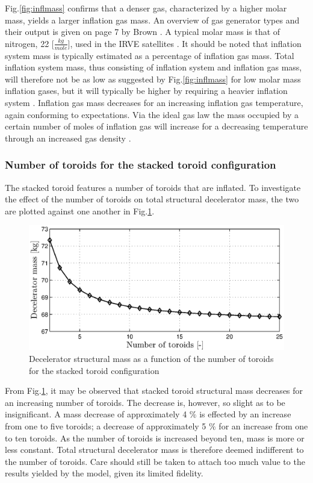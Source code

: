 Fig.\ref{fig:inflmass} confirms that a denser gas, characterized by a higher molar mass, yields a larger inflation gas mass. An overview of gas generator types and their output is given on page 7 by Brown \cite{Brown2003}. A typical molar mass is that of nitrogen, 22 [$\frac{kg}{mole}$], used in the IRVE satellites \cite{Dillman2012}. It should be noted that inflation system mass is typically estimated as a percentage of inflation gas mass. Total inflation system mass, thus consisting of inflation system and inflation gas mass, will therefore not be as low as suggested by Fig.\ref{fig:inflmass} for low molar mass inflation gases, but it will typically be higher by requiring a heavier inflation system \cite{Brown2003}. Inflation gas mass decreases for an increasing inflation gas temperature, again conforming to expectations. Via the ideal gas law the mass occupied by a certain number of moles of inflation gas will increase for a decreasing temperature through an increased gas density \cite{AndersonJr.2007}.

\subsubsection{Number of toroids for the stacked toroid configuration}
The stacked toroid features a number of toroids that are inflated. To investigate the effect of the number of toroids on total structural decelerator mass, the two are plotted against one another in Fig.\ref{fig:toro}. 

\begin{figure}[H]
\centering
\includegraphics[width = 1.0\textwidth]{Figure/mass_toroids.eps}
\caption{Decelerator structural mass as a function of the number of toroids for the stacked toroid configuration}
\label{fig:toro}
\end{figure}

From Fig.\ref{fig:toro}, it may be observed that stacked toroid structural mass decreases for an increasing number of toroids. The decrease is, however, so slight as to be insignificant. A mass decrease of approximately 4 $\%$ is effected by an increase from one to five toroids; a decrease of approximately 5 $\%$ for an increase from one to ten toroids. As the number of toroids is increased beyond ten, mass is more or less constant. Total structural decelerator mass is therefore deemed indifferent to the number of toroids. Care should still be taken to attach too much value to the results yielded by the model, given its limited fidelity.

